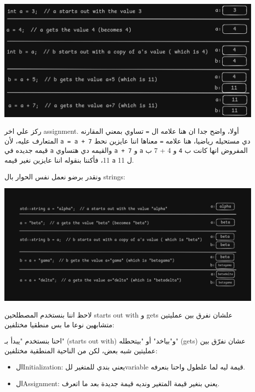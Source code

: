 \documentclass[11pt]{article}
\begin{document}
\begin{center}
\includegraphics[width=.9\linewidth]{../images/assignment_ints.png}
\end{center}

ركز علي اخر assignment. أولا، واضح جدا ان هنا علامه ال \texttt{=} تساوي بمعني المقارنه المتعارف عليه، لأن \texttt{a = a + 7} دي مستحيله رياضيا، هنا علامه \texttt{=} معناها اننا عايزين نحط قيمه جديده في \texttt{a} والقيمه دي هتساوي \texttt{a + 7} و \texttt{a} المفروض انها كانت ب \texttt{4} و 4 + 7 ب 11، فأكننا بنقوله اننا عايزين نغير قيمه \texttt{a} ل 11.

ونقدر برضو نعمل نفس الحوار بال strings:

\begin{center}
\includegraphics[width=.9\linewidth]{../images/assignment_strings.png}
\end{center}

لاحظ اننا بنستخدم المصطلحين starts out with و gets علشان نفرق بين عمليتين متشابهين نوعا ما بس منطقيا مختلفين:

احنا بنستخدم "يبدأ بـ" (starts out with) و"بياخد" أو "بيتحطله" (gets) عشان نفرّق بين عمليتين شبه بعض، لكن من الناحية المنطقية مختلفين:

\begin{itemize}
\item الInitialization: يعني بندي للمتغير للvariable قيمة ليه لما علطول واحنا بنعرفه.
\item الAssignment: يعني بنغير قيمة المتغير ونديه قيمة جديدة بعد ما اتعرف.
\end{itemize}
\end{document}
